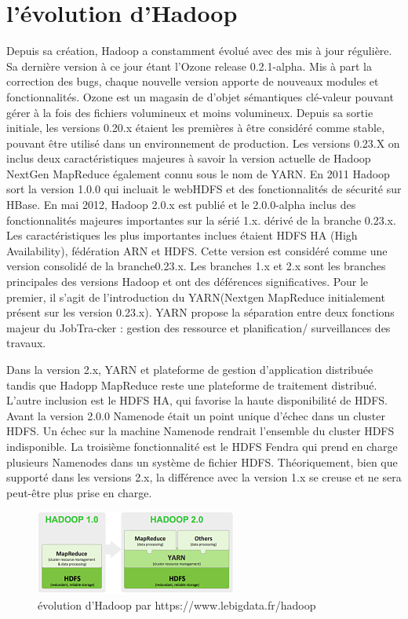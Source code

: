 \section{l'évolution d'Hadoop}
Depuis sa création, Hadoop a constamment évolué avec des mis à jour régulière. Sa dernière version à ce jour étant l’Ozone release 0.2.1-alpha. Mis à part la correction des bugs, chaque nouvelle version apporte de nouveaux modules et fonctionnalités. Ozone est un magasin de d’objet sémantiques clé-valeur pouvant gérer à la fois des fichiers volumineux et moins volumineux. Depuis sa sortie initiale, les versions 0.20.x étaient les premières à être considéré comme stable, pouvant être utilisé dans un environnement de production. Les versions 0.23.X on inclus deux caractéristiques majeures à savoir la version actuelle de Hadoop NextGen MapReduce également connu sous le nom de YARN. En 2011 Hadoop sort la version 1.0.0 qui incluait le webHDFS et des fonctionnalités de sécurité sur HBase. En mai 2012, Hadoop 2.0.x est publié et le 2.0.0-alpha inclus des fonctionnalités majeures importantes sur la sérié 1.x. dérivé de la branche 0.23.x. Les caractéristiques les plus importantes inclues étaient HDFS HA (High Availability), fédération ARN et HDFS. Cette version est considéré comme une version consolidé de la branche0.23.x. Les branches 1.x et 2.x sont les branches principales des versions Hadoop et ont des déférences significatives. Pour le premier, il s’agit de l’introduction du YARN(Nextgen MapReduce initialement présent sur les version 0.23.x). YARN propose la séparation entre deux fonctions majeur du JobTra-cker : gestion des ressource et planification/ surveillances des travaux.

Dans la version 2.x, YARN et plateforme de gestion d’application distribuée tandis que Hadopp MapReduce reste une plateforme de traitement distribué. L’autre inclusion est le HDFS HA, qui favorise la haute disponibilité de HDFS. Avant la version 2.0.0 Namenode était un point unique d’échec dans un cluster HDFS. Un échec sur la machine Namenode rendrait l’ensemble du cluster HDFS indisponible. La troisième fonctionnalité est le HDFS Fendra qui prend en charge plusieurs Namenodes dans un système de fichier HDFS. Théoriquement, bien que supporté dans les versions 2.x, la différence avec la version 1.x se creuse et ne sera peut-être plus prise en charge. \cite{polato_comprehensive_2014}
\begin{figure}
  \begin{center}
  \includegraphics{images/hadoop-evolution.png}
    \end{center}
    \caption{évolution d'Hadoop par https://www.lebigdata.fr/hadoop}
    \label{fig:https://www.lebigdata.fr/hadoop}
\end{figure}